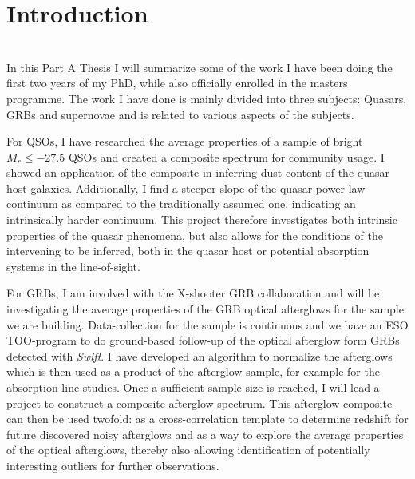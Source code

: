 %
\chapter{Introduction}
\label{sec:intro}

 \\

In this Part A Thesis I will summarize some of the work I have been doing the
first two years of my PhD, while also officially enrolled in the masters
programme. The work I have done is mainly divided into three subjects: Quasars,
GRBs and supernovae and is related to various aspects of the subjects. 

For QSOs, I have researched the average properties of a sample of bright $M_{r}
\leq -27.5$ QSOs and created a composite spectrum for community usage. I showed
an application of the composite in inferring dust content of the quasar host
galaxies. Additionally, I find a steeper slope of the quasar power-law continuum
as compared to the traditionally assumed one, indicating an intrinsically harder
continuum. This project therefore investigates both intrinsic properties of the
quasar phenomena, but also allows for the conditions of the intervening to be
inferred, both in the quasar host or potential absorption systems in the
line-of-sight.

For GRBs, I am involved with the X-shooter GRB collaboration and will be
investigating the average properties of the GRB optical afterglows for the
sample we are building. Data-collection for the sample is continuous and we have
an ESO TOO-program to do ground-based follow-up of the optical afterglow form
GRBs detected with \textit{Swift}.  I have developed an algorithm to normalize
the afterglows which is then used  as a product of the afterglow sample, for
example for the absorption-line studies. Once a sufficient sample size is
reached, I will lead a project to construct a composite afterglow spectrum. This
afterglow composite can then be used twofold: as a cross-correlation template to
determine redshift for future discovered noisy afterglows and as a way to
explore the average properties of the optical afterglows, thereby also allowing
identification of potentially interesting outliers for further observations. 

